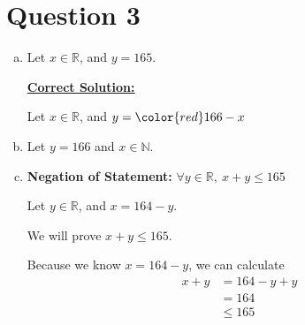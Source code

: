 \documentclass[12pt]{article}
\begin{document}
\section*{Question 3}
\begin{enumerate}[a.]
    \item

    Let $x \in \mathbb{R}$, and $y = 165$.

    \begin{mdframed}
        \underline{\textbf{Correct Solution:}}

        \bigskip

        Let $x \in \mathbb{R}$, and $y = \color{red} 166 - x$
    \end{mdframed}

    \item

    Let $y = 166$ and $x \in \mathbb{N}$.

    \item

    \textbf{Negation of Statement:} $\forall y \in \mathbb{R},\:x+y \leq 165$

    Let $y \in \mathbb{R}$, and $x = 164 - y$.

    \bigskip

    We will prove $x + y \leq 165$.

    \bigskip

    Because we know $x = 164 - y$, we can calculate
    \setcounter{equation}{0}
    \begin{align}
        x+y &= 164-y+y\\
        &= 164\\
        &\leq 165
    \end{align}
\end{enumerate}
\end{document}
